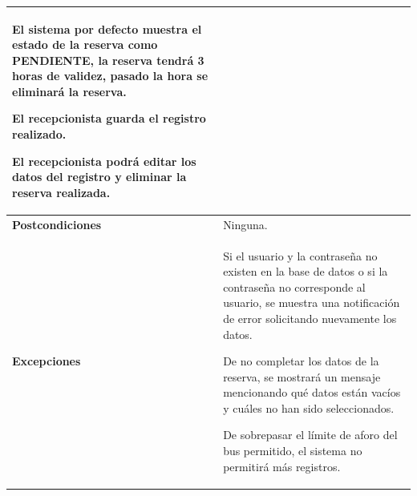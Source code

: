 \begin{longtable}{m{4cm} m{10.5cm}}
		El sistema por defecto muestra el estado de la reserva como PENDIENTE, la reserva tendrá 3 horas de validez, pasado la hora se eliminará la reserva.
		
		El recepcionista guarda el registro realizado. 
		
		El recepcionista podrá editar los datos del registro y eliminar la reserva realizada. \\ \hline
		
		\textbf{Postcondiciones} & Ninguna.\\ \hline
		\textbf{Excepciones} & Si el usuario y la contraseña no existen en la base de datos o si la contraseña no corresponde al usuario, se muestra una notificación de error solicitando nuevamente los datos.
		
		De no completar los datos de la reserva, se mostrará un mensaje mencionando qué datos están vacíos y cuáles no han sido seleccionados.
		
		De sobrepasar el límite de aforo del bus permitido, el sistema no permitirá más registros. \\ 
		
	\end{longtable}
	
	\endgroup 
	\vspace{-6pt}  %
	
	
	\begingroup
	\onehalfspacing
	
